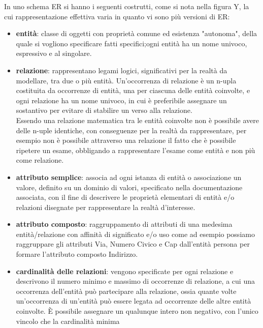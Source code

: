 \documentclass[a4paper,12pt, oneside]{book}
\begin{document}
In uno schema ER si hanno i seguenti costrutti, come si nota nella figura Y,
la cui rappresentazione effettiva varia in quanto vi sono più versioni di ER:
\begin{itemize}
        \item \textbf{entità}: classe di oggetti con proprietà comune ed esistenza "autonoma", della quale si vogliono specificare 
              fatti specifici;ogni entità ha un nome univoco, espressivo e al singolare.
      \item \textbf{relazione}: rappresentano legami logici, significativi per la realtà da modellare, tra due o più entità.\newline
            Un'occorrenza di relazione è un n-upla costituita da occorrenze di entità, una per ciascuna delle entità coinvolte,
          e ogni relazione ha un nome univoco, in cui è preferibile assegnare un sostantivo per evitare di stabilire un verso alla relazione.\\
          Essendo una relazione matematica tra le entità coinvolte non è possibile avere delle n-uple identiche, con conseguenze
          per la realtà da rappresentare, per esempio non è possibile attraverso una relazione il fatto che è possibile 
          ripetere un esame, obbligando a rappresentare l'esame come entità e non più come relazione.
  \item \textbf{attributo semplice}: associa ad ogni istanza di entità o associazione un valore, definito su un dominio di valori,
          specificato nella documentazione associata, con il fine di descrivere le proprietà elementari 
          di entità e/o relazioni disegnate per rappresentare la realtà d'interesse.\newline
  \item \textbf{attributo composto}: raggruppamento di attributi di una medesima entità/relazione con affinità di significato e/o uso
          come ad esempio possiamo raggruppare gli attributi Via, Numero Civico e Cap dall'entità persona per formare 
          l'attributo composto Indirizzo.
  \item \textbf{cardinalità delle relazioni}: vengono specificate per ogni relazione e descrivono il numero minimo e massimo di occorrenze
            di relazione, a cui una occorrenza dell'entità può partecipare alla relazione, ossia quante volte un'occorrenza 
            di un'entità può essere legata ad occorrenze delle altre entità coinvolte.\newline
          È possibile assegnare un qualunque intero non negativo, con l'unico vincolo che la cardinalità minima 

\end{itemize}
\end{document}
